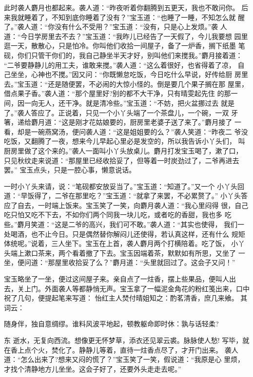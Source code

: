 此时袭人麝月也都起来。袭人道：“昨夜听着你翻腾到五更天，我也不敢问你。
后来我就睡着了，不知到底你睡着了没有？”宝玉道：“也睡了一睡，不知怎么就
醒了。”袭人道：“你没有什么不受用？”宝玉道：“没有，只是心上发烦。”袭
人道：“今日学房里去不去？”宝玉道：“我昨儿已经告了一天假了，今儿我要想
园里逛一天，散散心，只是怕冷。你叫他们收拾一间屋子，备了一炉香，搁下纸墨
笔砚，你们只管干你们的，我自己静坐半天才好，别叫他们来搅我。”麝月接着道：
“二爷要静静儿的用工夫，谁敢来搅。”袭人道：“这么着很好，也省得着了凉，
自己坐坐，心神也不搅。”因又问：“你既懒怠吃饭，今日吃什么早说，好传给厨
房里去。”宝玉道：“还是随便罢，不必闹的大惊小怪的。倒是要几个果子搁在那
屋里，借点果子香。”袭人道：“那个屋里好?别的都不大干净，只有晴雯起先住
的那一间，因一向无人，还干净。就是清冷些。”宝玉道：“不妨，把火盆挪过去
就是了。”袭人答应了。正说着，只见一个小丫头端了一个茶盘儿，一个碗，一双
牙箸，递给麝月道：“这是刚才花姑娘要的，厨房里老婆子送了来了。”麝月接了
一看，却是一碗燕窝汤，便问袭人道：“这是姐姐要的么？”袭人笑道：“昨夜二
爷没吃饭，又翻腾了一夜，想来今儿早起心里必是发空的，所以我告诉小丫头们，
叫厨房里做了这个来的。”袭人一面叫小丫头放桌儿。麝月打发宝玉喝了，漱了口，
只见秋纹走来说道：“那屋里已经收拾妥了，但等着一时炭劲过了，二爷再进去罢。”
宝玉点头，只是一腔心事，懒意说话。

一时小丫头来请，说：“笔砚都安放妥当了。”宝玉道：“知道了。”又一个
小丫头回道：“早饭得了，二爷在那里吃？”宝玉道：“就拿了来罢，不必累赘了。”
小丫头答应了自去，一时端上饭来。宝玉笑了一笑，向麝月袭人道：“我心里闷得
很，自己吃只怕又吃不下去，不如你们两个同我一块儿吃，或者吃的香甜，我也多
吃些。”麝月笑道：“这是二爷的高兴，我们可不敢。”袭人道：“其实也使得，
我们一处喝酒，也不止今日。只是偶然替你解闷儿还使得，若认真这样，还有什么
规矩体统呢。”说着，三人坐下。宝玉在上首，袭人麝月两个打横陪着。吃了饭，
小丫头端上漱口茶来，两个看着撤了下去。宝玉因端着茶，默默如有所思，又坐了
一坐，便问道：“那屋里收拾妥了么？”麝月道：“头里就回过了。这会子又问！”

宝玉略坐了一坐，便过这间屋子来。亲自点了一炷香，摆上些果品，便叫人出
去，关上门。外面袭人等都静悄无声。宝玉拿了一幅泥金角花的粉红笺出来，口中
祝了几句，便提起笔来写道：
怡红主人焚付晴姐知之：酌茗清香，庶几来飨。
其词云：

随身伴，独自意绸缪。谁料风波平地起，顿教躯命即时休：孰与话轻柔?

东
逝水，无复向西流。想像更无怀梦草，添衣还见翠云裘。脉脉使人愁!
写毕，就在香上点个火，焚化了。静静儿等着，直待一炷香点尽了，才开门出来。
袭人道：“怎么出来了?想来又闷的慌了？”宝玉笑了一笑，假说道：“我原是心
里烦，才找个清静地方儿坐坐。这会子好了，还要外头走走去呢。”

